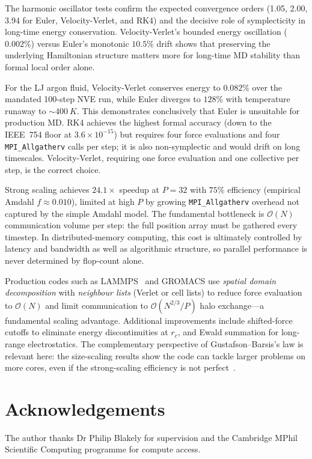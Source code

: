 \documentclass[10pt,twocolumn]{article}
\begin{document}
The harmonic oscillator tests confirm the expected convergence orders (1.05,
2.00, 3.94 for Euler, Velocity-Verlet, and RK4) and the decisive role of
symplecticity in long-time energy conservation.
Velocity-Verlet's bounded energy oscillation ($0.002\%$) versus Euler's
monotonic $10.5\%$ drift shows that preserving the underlying Hamiltonian
structure matters more for long-time MD stability than formal local order alone.

For the LJ argon fluid, Velocity-Verlet conserves energy to $0.082\%$ over
the mandated 100-step NVE run, while Euler diverges to $128\%$ with
temperature runaway to $\sim\SI{400}{K}$.
This demonstrates conclusively that Euler is unsuitable for production MD.
RK4 achieves the highest formal accuracy (down to the IEEE~754 floor at
$3.6\times10^{-15}$) but requires four force evaluations and four
\texttt{MPI\_Allgatherv} calls per step; it is also non-symplectic and would
drift on long timescales. Velocity-Verlet, requiring one force evaluation
and one collective per step, is the correct choice.

Strong scaling achieves $24.1\times$ speedup at $P=32$ with $75\%$
efficiency (empirical Amdahl $f\approx0.010$), limited at high $P$ by
growing \texttt{MPI\_Allgatherv} overhead not captured by the simple
Amdahl model.
The fundamental bottleneck is $\mathcal{O}(N)$ communication volume per step:
the full position array must be gathered every timestep. In distributed-memory
computing, this cost is ultimately controlled by latency and bandwidth as well
as algorithmic structure, so parallel performance is never determined by
flop-count alone.

Production codes such as LAMMPS~\citep{Thompson2022} and GROMACS use
\emph{spatial domain decomposition} with \emph{neighbour lists} (Verlet or
cell lists) to reduce force evaluation to $\mathcal{O}(N)$ and limit
communication to $\mathcal{O}(N^{2/3}/P)$ halo exchange---a fundamental
scaling advantage.
Additional improvements include shifted-force cutoffs to eliminate energy
discontinuities at $r_c$, and Ewald summation for long-range electrostatics.
The complementary perspective of Gustafson--Barsis's law is relevant here:
the size-scaling results show the code can tackle larger problems on more
cores, even if the strong-scaling efficiency is not perfect~\citep{Gustafson1988}.

\section*{Acknowledgements}
The author thanks Dr Philip Blakely for supervision and the Cambridge MPhil
Scientific Computing programme for compute access.
\end{document}
